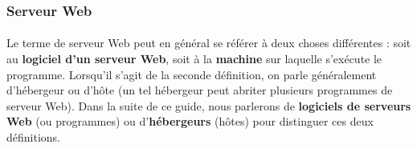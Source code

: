 	  
	  \subsubsection{Serveur Web}
	    \paragraph{}
	    Le terme de serveur Web peut en général se référer à deux choses différentes : soit au \textbf{logiciel d’un serveur Web}, soit à la \textbf{machine} sur laquelle s’exécute le programme. Lorsqu’il s’agit de la seconde définition, on parle généralement d’hébergeur ou d’hôte (un tel hébergeur peut abriter plusieurs programmes de serveur Web). Dans la suite de ce guide, nous parlerons de \textbf{logiciels de serveurs Web} (ou programmes) ou d’\textbf{hébergeurs} (hôtes) pour distinguer ces deux définitions.\\
